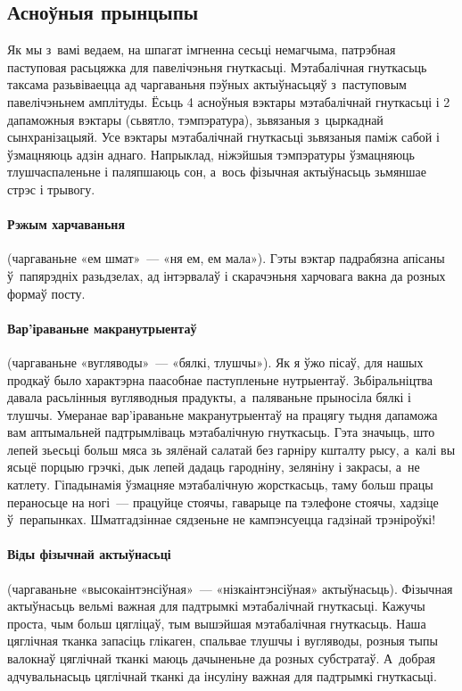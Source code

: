 \subsection{Асноўныя прынцыпы}

Як мы з~вамі ведаем, на шпагат імгненна сесьці немагчыма, патрэбная паступовая расьцяжка для павелічэньня гнуткасьці. Мэтабалічная гнуткасьць таксама разьвіваецца ад чаргаваньня пэўных актыўнасьцяў з~паступовым павелічэньнем амплітуды. Ёсьць 4 асноўныя вэктары мэтабалічнай гнуткасьці і 2 дапаможныя вэктары (сьвятло, тэмпэратура), зьвязаныя з~цыркаднай сынхранізацыяй. Усе вэктары мэтабалічнай гнуткасьці зьвязаныя паміж сабой і ўзмацняюць адзін аднаго. Напрыклад, ніжэйшыя тэмпэратуры ўзмацняюць тлушчаспаленьне і паляпшаюць сон, а~вось фізычная актыўнасьць зьмяншае стрэс і трывогу.

\paragraph{Рэжым харчаваньня} (чаргаваньне «ем шмат»~--- «ня ем, ем мала»).
Гэты вэктар падрабязна апісаны ў~папярэдніх разьдзелах, ад інтэрвалаў і скарачэньня харчовага вакна да розных формаў посту.

\paragraph{Вар'іраваньне макранутрыентаў} (чаргаваньне «вугляводы»~--- «бялкі, тлушчы»).
Як я ўжо пісаў, для нашых продкаў было характэрна паасобнае паступленьне нутрыентаў. Зьбіральніцтва давала расьлінныя вугляводныя прадукты, а~паляваньне прыносіла бялкі і тлушчы. Умеранае вар'іраваньне макранутрыентаў на працягу тыдня дапаможа вам аптымальней падтрымліваць мэтабалічную гнуткасьць. Гэта значыць, што лепей зьесьці больш мяса зь зялёнай салатай без гарніру кшталту рысу, а~калі вы ясьцё порцыю грэчкі, дык лепей дадаць гародніну, зеляніну і закрасы, а~не катлету.
Гіпадынамія ўзмацняе мэтабалічную жорсткасьць, таму больш працы пераносьце на ногі~--- працуйце стоячы, гаварыце па тэлефоне стоячы, хадзіце ў~перапынках. Шматгадзіннае сядзеньне не кампэнсуецца гадзінай трэніроўкі!

\paragraph{Віды фізычнай актыўнасьці} (чаргаваньне «высокаінтэнсіўная»~--- «нізкаінтэнсіўная» актыўнасьць).
Фізычная актыўнасьць вельмі важная для падтрымкі мэтабалічнай гнуткасьці. Кажучы проста, чым больш цягліцаў, тым вышэйшая мэтабалічная гнуткасьць. Наша цяглічная тканка запасіць глікаген, спальвае тлушчы і вугляводы, розныя тыпы валокнаў цяглічнай тканкі маюць дачыненьне да розных субстратаў. А~добрая адчувальнасьць цяглічнай тканкі да інсуліну важная для падтрымкі гнуткасьці.

